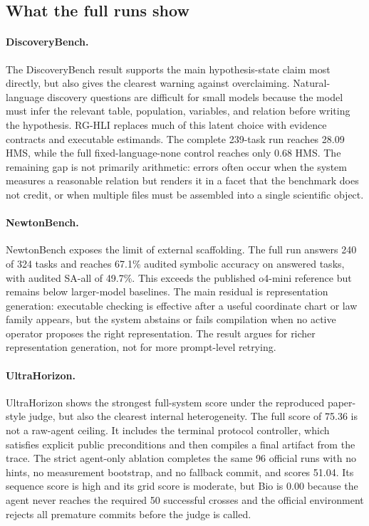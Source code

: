\documentclass[letterpaper]{article}
\newcommand{\methodshort}{\textsc{RG-HLI}\xspace}
\begin{document}
\FloatBarrier

\subsection{What the full runs show}

\paragraph{DiscoveryBench.}
The DiscoveryBench result supports the main hypothesis-state claim most
directly, but also gives the clearest warning against overclaiming.
Natural-language discovery questions are difficult for small models because
the model must infer the relevant table, population, variables, and relation
before writing the hypothesis. \methodshort replaces much of this latent choice with
evidence contracts and executable estimands. The complete 239-task run reaches
28.09 HMS, while the full fixed-language-none control reaches only 0.68 HMS.
The remaining gap is not primarily arithmetic: errors often occur when the
system measures a reasonable relation but renders it in a facet that the
benchmark does not credit, or when multiple files must be assembled into a
single scientific object.

\paragraph{NewtonBench.}
NewtonBench exposes the limit of external scaffolding. The full run answers
240 of 324 tasks and reaches 67.1\% audited symbolic accuracy on answered tasks,
with audited SA-all of 49.7\%. This exceeds the published o4-mini
reference but remains below larger-model baselines. The main residual is
representation generation: executable checking is effective after a useful
coordinate chart or law family appears, but the system abstains or fails
compilation when no active operator proposes the right representation. The
result argues for richer representation generation, not for more prompt-level
retrying.

\paragraph{UltraHorizon.}
UltraHorizon shows the strongest full-system score under the reproduced
paper-style judge, but also the clearest internal heterogeneity. The full
score of 75.36 is not a raw-agent ceiling. It includes the terminal protocol
controller, which satisfies explicit public preconditions and then compiles a
final artifact from the trace. The strict agent-only ablation completes the
same 96 official runs with no hints, no measurement bootstrap, and no fallback
commit, and scores 51.04. Its sequence score is high and its grid score is
moderate, but Bio is 0.00 because the agent never reaches the required
50 successful crosses and the official environment rejects all premature
commits before the judge is called.
\end{document}
